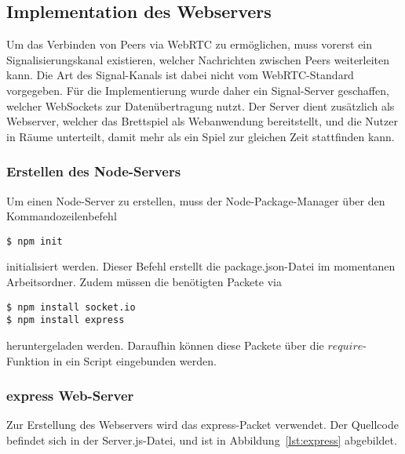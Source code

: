 \subsection{Implementation des Webservers}
Um das Verbinden von Peers via WebRTC zu ermöglichen, muss vorerst ein Signalisierungskanal existieren, welcher Nachrichten zwischen Peers weiterleiten kann. Die Art des Signal-Kanals ist dabei nicht vom WebRTC-Standard vorgegeben. Für die Implementierung wurde daher ein Signal-Server geschaffen, welcher WebSockets zur Datenübertragung nutzt. Der Server dient zusätzlich als Webserver, welcher das Brettspiel als Webanwendung bereitstellt, und die Nutzer in \glqq{}Räume\grqq{} unterteilt, damit mehr als ein Spiel zur gleichen Zeit stattfinden kann.\par

\subsubsection{Erstellen des Node-Servers}
Um einen Node-Server zu erstellen, muss der Node-Package-Manager über den Kommandozeilenbefehl

\lstset{style=STYLE_COMMAND_LINE_ARGUMENT_SINGLE_LINE}
\begin{lstlisting}[belowskip=-0.8 \baselineskip]
$ npm init
\end{lstlisting}

initialisiert werden. Dieser Befehl erstellt die \glqq{}package.json\grqq{}-Datei im momentanen Arbeitsordner. Zudem müssen die benötigten Packete via

\lstset{style=STYLE_COMMAND_LINE_ARGUMENT_SINGLE_LINE}
\begin{lstlisting}[belowskip=-0.8 \baselineskip]
$ npm install socket.io
$ npm install express
\end{lstlisting}

heruntergeladen werden. Daraufhin können diese Packete über die $require$-Funktion in ein Script eingebunden werden.

\subsubsection{express Web-Server}
Zur Erstellung des Webservers wird das \glqq{}express\grqq{}-Packet verwendet. Der Quellcode befindet sich in der \glqq{}Server.js\grqq{}-Datei, und ist in Abbildung~\ref{lst:express} abgebildet.


